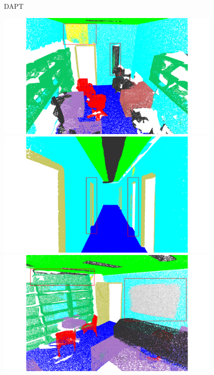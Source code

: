 \begin{figure}[htbp]
    \begin{minipage}{0.09\textwidth}
        \centering
        DAPT
    \end{minipage}
    \hfill
    \begin{minipage}{0.22\textwidth}
        \centering
        \includegraphics[width=\textwidth]{fig/supplement/semantic_segmentation/office_9/DAPT_office_9.pdf}
    \end{minipage}
    \hfill
    \begin{minipage}{0.22\textwidth}
        \centering
        \includegraphics[width=\textwidth]{fig/supplement/semantic_segmentation/hallway_10/DAPT_hallway_10.pdf}
    \end{minipage}
    \hfill
    \begin{minipage}{0.22\textwidth}
        \centering
        \includegraphics[width=\textwidth]{fig/supplement/semantic_segmentation/office_35/DAPT_office_35.pdf}

\end{minipage}
\end{figure}

